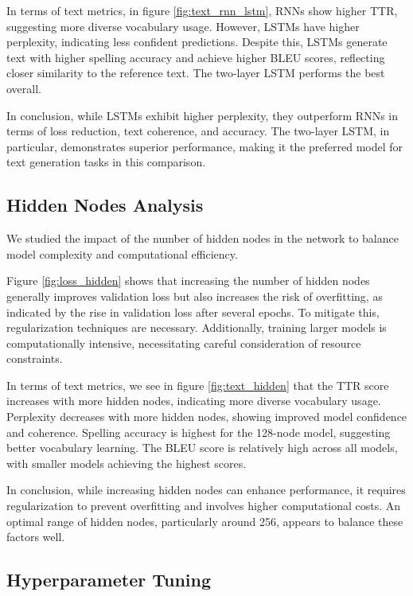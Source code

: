 \documentclass{article}
\begin{document}
In terms of text metrics, in figure \ref{fig:text_rnn_lstm}, RNNs show higher TTR, suggesting more diverse vocabulary usage. However, LSTMs have higher perplexity, indicating less confident predictions. Despite this, LSTMs generate text with higher spelling accuracy and achieve higher BLEU scores, reflecting closer similarity to the reference text. The two-layer LSTM performs the best overall.

In conclusion, while LSTMs exhibit higher perplexity, they outperform RNNs in terms of loss reduction, text coherence, and accuracy. The two-layer LSTM, in particular, demonstrates superior performance, making it the preferred model for text generation tasks in this comparison. 

\subsection{Hidden Nodes Analysis}

We studied the impact of the number of hidden nodes in the network to balance model complexity and computational efficiency.

Figure \ref{fig:loss_hidden} shows that increasing the number of hidden nodes generally improves validation loss but also increases the risk of overfitting, as indicated by the rise in validation loss after several epochs. To mitigate this, regularization techniques are necessary. Additionally, training larger models is computationally intensive, necessitating careful consideration of resource constraints.

In terms of text metrics, we see in figure \ref{fig:text_hidden} that the TTR score increases with more hidden nodes, indicating more diverse vocabulary usage. Perplexity decreases with more hidden nodes, showing improved model confidence and coherence. Spelling accuracy is highest for the 128-node model, suggesting better vocabulary learning. The BLEU score is relatively high across all models, with smaller models achieving the highest scores.

In conclusion, while increasing hidden nodes can enhance performance, it requires regularization to prevent overfitting and involves higher computational costs. An optimal range of hidden nodes, particularly around 256, appears to balance these factors well.

\subsection{Hyperparameter Tuning}
\end{document}
